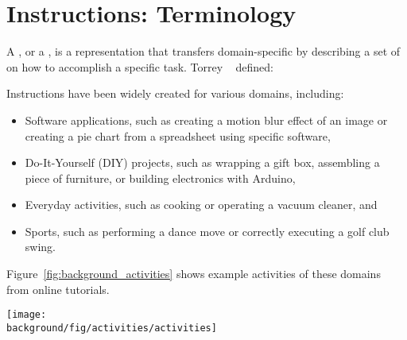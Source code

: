 
\section{Instructions: Terminology}
\label{background_terms}

A , or a , is a representation that transfers domain-specific  by describing a set of  on how to accomplish a specific task. Torrey \ea{}~\cite{Torrey:2007he} defined:
\begin{quote}
\end{quote}
%
%
Instructions have been widely created for various domains, including:

\begin{itemize}
  \item Software applications, such as creating a motion blur effect of an image or creating a pie chart from a spreadsheet using specific software,
  \item Do-It-Yourself (DIY) projects, such as wrapping a gift box, assembling a piece of furniture, or building electronics with Arduino,
  \item Everyday activities, such as cooking or operating a vacuum cleaner, and
  \item Sports, such as performing a dance move or correctly executing a golf club swing.
\end{itemize}

Figure~\ref{fig:background_activities} shows example activities of these domains from online tutorials.
\\

\begin{figure*}[b!]
  \centering
  \begin{minipage}{\textwidth}
  \texttt{[image: \\background/fig/activities/activities]}
  \caption[Example activities in tutorial domains.]{Example activities in tutorial domains:
  a) image manipulations using a software application
  \footnote{``Photoshop Playbook: Selective Focus'', \url{https://youtu.be/Wh3ahxqDnyw} \copyright2016 with express permission from Adobe Systems Incorporated.},
  b) wrapping a gift, a DIY task
  \footnote{``How to do a Japanese Gift Wrap'' by Rouge Shop, \url{https://youtu.be/Mf3IyeMF8ug}, licensed under CC BY 2.0},
  c) cooking, an everyday activity
  \footnote{``How to Cook a Turkey in a Convection Oven'' by Six Sisters' Stuff, \url{https://youtu.be/QNkwKj1Vsuc}, licensed under CC BY 2.0}, and
  d) golf lessons in sports
  \footnote{``Pat's Golf Tips Top of Swing Position'' by Blue Rock Golf Academy, \url{https://youtu.be/H06o7fMQSi4, licensed under CC BY 2.0}}.
  }
  \label{fig:background_activities}
  \end{minipage}
\end{figure*}

